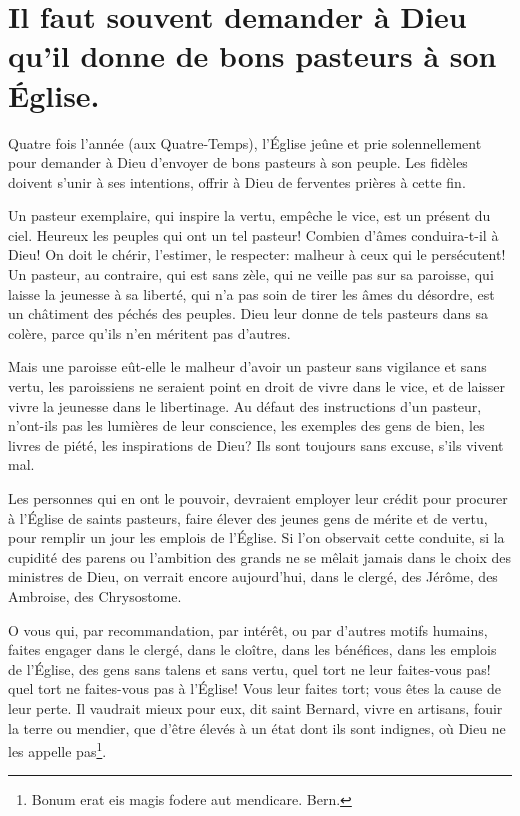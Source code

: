 \documentclass[instructions.tex]{subfiles}
\begin{document}
 
\chapter{Il faut souvent demander à Dieu qu'il donne de bons pasteurs à son Église.}
 
\primo Quatre fois l'année (aux Quatre-Temps), l'Église jeûne et prie solennellement pour demander à Dieu d'envoyer de bons pasteurs à son peuple. Les fidèles doivent s'unir à ses intentions, offrir à Dieu de ferventes prières à cette fin.
 
Un pasteur exemplaire, qui inspire la vertu, empêche le vice, est un présent du ciel. Heureux les peuples qui ont un tel pasteur! Combien d'âmes conduira-t-il à Dieu! On doit le chérir, l'estimer, le respecter: malheur à ceux qui le persécutent! Un pasteur, au contraire, qui est sans zèle, qui ne veille pas sur sa paroisse, qui laisse la jeunesse à sa liberté, qui n'a pas soin de tirer les âmes du désordre, est un châtiment des péchés des peuples. Dieu leur donne de tels pasteurs dans sa colère, parce qu'ils n'en méritent pas d'autres.
 
Mais une paroisse eût-elle le malheur d'avoir un pasteur sans vigilance et sans vertu, les paroissiens ne seraient point en droit de vivre dans le vice, et de laisser vivre la jeunesse dans le libertinage. Au défaut des instructions d'un pasteur, n'ont-ils pas les lumières de leur conscience, les exemples des gens de bien, les livres de piété, les inspirations de Dieu? Ils sont toujours sans excuse, s'ils vivent mal.
 
\secundo Les personnes qui en ont le pouvoir, devraient employer leur crédit pour procurer à l'Église de saints pasteurs, faire élever des jeunes gens de mérite et de vertu, pour remplir un jour les emplois de l'Église. Si l'on observait cette conduite, si la cupidité des parens ou l'ambition des grands ne se mêlait jamais dans le choix des ministres de Dieu, on verrait encore aujourd'hui, dans le clergé, des Jérôme, des Ambroise, des Chrysostome.
 
O vous qui, par recommandation, par intérêt, ou par d'autres motifs humains, faites engager dans le clergé, dans le cloître, dans les bénéfices, dans les emplois de l'Église, des gens sans talens et sans vertu, quel tort ne leur faites-vous pas! quel tort ne faites-vous pas à l'Église! Vous leur faites tort; vous êtes la cause de leur perte. Il vaudrait mieux pour eux, dit saint Bernard, vivre en artisans, fouir la terre ou mendier, que d'être élevés à un état dont ils sont indignes, où Dieu ne les appelle pas\footnote{Bonum erat eis magis fodere aut mendicare. Bern.}.
 
\end{document}
